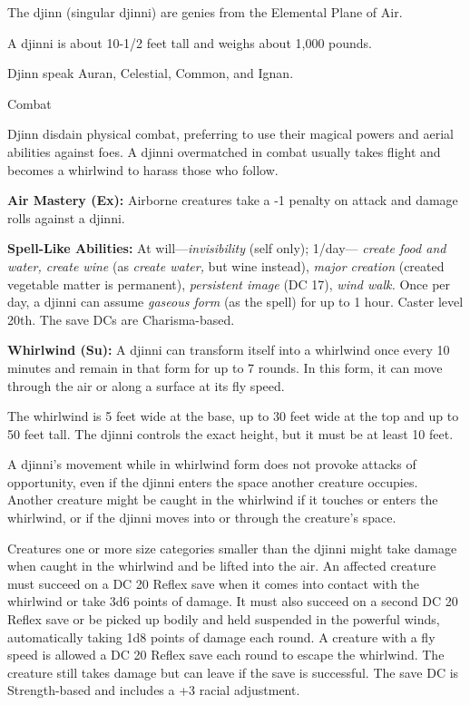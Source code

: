 \documentclass{article}
\begin{document}
The djinn (singular djinni) are genies from the Elemental Plane of Air. 

A djinni is about 10-1/2 feet tall and weighs about 1,000 pounds.

Djinn speak Auran, Celestial, Common, and Ignan.

Combat

Djinn disdain physical combat, preferring to use their magical powers and aerial 
abilities against foes. A djinni overmatched in combat usually takes flight and 
becomes a whirlwind to harass those who follow.

\textbf{Air Mastery (Ex):} Airborne creatures take a -1 penalty on attack and damage 
rolls against a djinni.

\textbf{Spell-Like Abilities: }At will---\textit{invisibility }(self only); 1/day--- 
\textit{create food and water, create wine }(as \textit{create water, }but wine 
instead), \textit{major creation }(created vegetable matter is permanent), \textit{persistent 
image }(DC 17), \textit{wind walk. }Once per day, a djinni can assume \textit{gaseous 
form }(as the spell) for up to 1 hour. Caster level 20th. The save DCs are Charisma-based.

\textbf{Whirlwind (Su): }A djinni can transform itself into a whirlwind once every 
10 minutes and remain in that form for up to 7 rounds. In this form, it can move 
through the air or along a surface at its fly speed.

The whirlwind is 5 feet wide at the base, up to 30 feet wide at the top and up 
to 50 feet tall. The djinni controls the exact height, but it must be at least 
10 feet.

A djinni's movement while in whirlwind form does not provoke attacks of opportunity, 
even if the djinni enters the space another creature occupies. Another creature 
might be caught in the whirlwind if it touches or enters the whirlwind, or if the 
djinni moves into or through the creature's space.

Creatures one or more size categories smaller than the djinni might take damage 
when caught in the whirlwind and be lifted into the air. An affected creature must 
succeed on a DC 20 Reflex save when it comes into contact with the whirlwind or 
take 3d6 points of damage. It must also succeed on a second DC 20 Reflex save or 
be picked up bodily and held suspended in the powerful winds, automatically taking 
1d8 points of damage each round. A creature with a fly speed is allowed a DC 20 
Reflex save each round to escape the whirlwind. The creature still takes damage 
but can leave if the save is successful. The save DC is Strength-based and includes 
a +3 racial adjustment.
\end{document}
